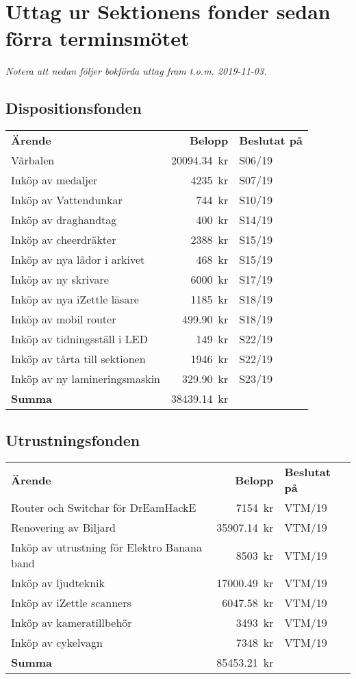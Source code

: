 \documentclass[../_main/handlingar.tex]{subfiles}
\begin{document}
\section{Uttag ur Sektionens fonder sedan förra terminsmötet}
\emph{Notera att nedan följer bokförda uttag fram t.o.m. 2019-11-03.}

\subsection*{Dispositionsfonden}
\begin{tabular}{l r l}
    \textbf{Ärende} & \textbf{Belopp} & \textbf{Beslutat på} \\
    Vårbalen & \SI{20094.34}{kr} & S06/19 \\
    Inköp av medaljer & \SI{4235}{kr} & S07/19 \\
    Inköp av Vattendunkar & \SI{744}{kr} & S10/19 \\
    Inköp av draghandtag & \SI{400}{kr} & S14/19 \\
    Inköp av cheerdräkter & \SI{2388}{kr} & S15/19 \\
    Inköp av nya lådor i arkivet & \SI{468}{kr} & S15/19 \\
    Inköp av ny skrivare & \SI{6000}{kr} & S17/19 \\
    Inköp av nya iZettle läsare & \SI{1185}{kr} & S18/19 \\
    Inköp av mobil router & \SI{499.90}{kr} & S18/19 \\
    Inköp av tidningsställ i LED & \SI{149}{kr} & S22/19 \\
    Inköp av tårta till sektionen & \SI{1946}{kr} & S22/19 \\
    Inköp av ny lamineringsmaskin & \SI{329.90}{kr} & S23/19 \\
    \hline
    \textbf{Summa} & \SI{38439.14}{kr} \\
\end{tabular}

\subsection*{Utrustningsfonden}
\begin{tabular}{l r l}
    \textbf{Ärende} & \textbf{Belopp} & \textbf{Beslutat på} \\
    Router och Switchar för DrEamHackE & \SI{7154}{kr} & VTM/19 \\
    Renovering av Biljard & \SI{35907.14}{kr} & VTM/19 \\
    Inköp av utrustning för Elektro Banana band & \SI{8503}{kr} & VTM/19 \\
    Inköp av ljudteknik & \SI{17000.49}{kr} & VTM/19 \\
    Inköp av iZettle scanners & \SI{6047.58}{kr} & VTM/19 \\
    Inköp av kameratillbehör & \SI{3493}{kr} & VTM/19 \\
    Inköp av cykelvagn & \SI{7348}{kr} & VTM/19 \\
    \hline
    \textbf{Summa} & \SI{85453.21}{kr} \\
\end{tabular}
\end{document}
